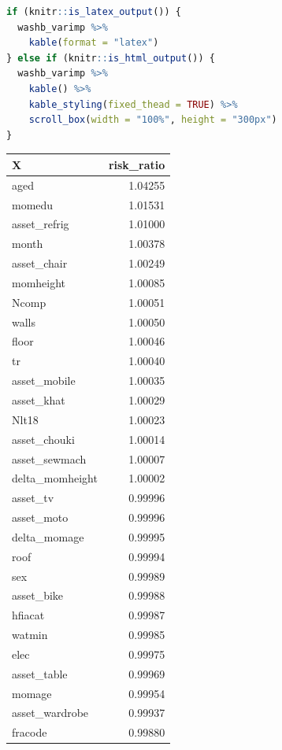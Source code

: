 \documentclass[12pt, krantz2,]{krantz}
\theoremstyle{definition}
\theoremstyle{definition}
\theoremstyle{definition}
\newcommand{\1}{\mathbbm{1}}
\begin{document}
\begin{lstlisting}[language=R]
if (knitr::is_latex_output()) {
  washb_varimp %>%
    kable(format = "latex")
} else if (knitr::is_html_output()) {
  washb_varimp %>%
    kable() %>%
    kable_styling(fixed_thead = TRUE) %>%
    scroll_box(width = "100%", height = "300px")
}
\end{lstlisting}

\begin{tabular}{l|r}
\hline
X & risk\_ratio\\
\hline
aged & 1.04255\\
\hline
momedu & 1.01531\\
\hline
asset\_refrig & 1.01000\\
\hline
month & 1.00378\\
\hline
asset\_chair & 1.00249\\
\hline
momheight & 1.00085\\
\hline
Ncomp & 1.00051\\
\hline
walls & 1.00050\\
\hline
floor & 1.00046\\
\hline
tr & 1.00040\\
\hline
asset\_mobile & 1.00035\\
\hline
asset\_khat & 1.00029\\
\hline
Nlt18 & 1.00023\\
\hline
asset\_chouki & 1.00014\\
\hline
asset\_sewmach & 1.00007\\
\hline
delta\_momheight & 1.00002\\
\hline
asset\_tv & 0.99996\\
\hline
asset\_moto & 0.99996\\
\hline
delta\_momage & 0.99995\\
\hline
roof & 0.99994\\
\hline
sex & 0.99989\\
\hline
asset\_bike & 0.99988\\
\hline
hfiacat & 0.99987\\
\hline
watmin & 0.99985\\
\hline
elec & 0.99975\\
\hline
asset\_table & 0.99969\\
\hline
momage & 0.99954\\
\hline
asset\_wardrobe & 0.99937\\
\hline
fracode & 0.99880\\
\hline
\end{tabular}
\end{document}
